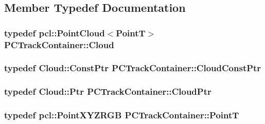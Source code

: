 \subsection{\-Member \-Typedef \-Documentation}
\hypertarget{class_p_c_track_container_ad70a8e8d9236664790fd8d76a2ebeadb}{
\subsubsection[{\-Cloud}]{\setlength{\rightskip}{0pt plus 5cm}typedef pcl\-::\-Point\-Cloud$<${\bf \-Point\-T}$>$ {\bf \-P\-C\-Track\-Container\-::\-Cloud}}}\label{class_p_c_track_container_ad70a8e8d9236664790fd8d76a2ebeadb}
\hypertarget{class_p_c_track_container_a14e4333a2498a4a5728e888fc473b129}{
\subsubsection[{\-Cloud\-Const\-Ptr}]{\setlength{\rightskip}{0pt plus 5cm}typedef \-Cloud\-::\-Const\-Ptr {\bf \-P\-C\-Track\-Container\-::\-Cloud\-Const\-Ptr}}}\label{class_p_c_track_container_a14e4333a2498a4a5728e888fc473b129}
\hypertarget{class_p_c_track_container_a6e14769099ac04f16c881162f9397f56}{
\subsubsection[{\-Cloud\-Ptr}]{\setlength{\rightskip}{0pt plus 5cm}typedef \-Cloud\-::\-Ptr {\bf \-P\-C\-Track\-Container\-::\-Cloud\-Ptr}}}\label{class_p_c_track_container_a6e14769099ac04f16c881162f9397f56}
\hypertarget{class_p_c_track_container_a37571d1fb0e896825033974c21a59ada}{
\subsubsection[{\-Point\-T}]{\setlength{\rightskip}{0pt plus 5cm}typedef pcl\-::\-Point\-X\-Y\-Z\-R\-G\-B {\bf \-P\-C\-Track\-Container\-::\-Point\-T}}}\label{class_p_c_track_container_a37571d1fb0e896825033974c21a59ada}


